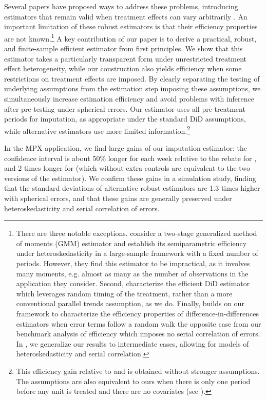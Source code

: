 \documentclass[english,11pt]{article}
\theoremstyle{plain}
\theoremstyle{plain}
\theoremstyle{plain}
\theoremstyle{plain}
\let\ref\Cref
\begin{document}
Several papers have proposed ways to address these problems, introducing
estimators that remain valid when treatment effects can vary arbitrarily
\parencite{DeChaisemartin2020,Abraham2018,Callaway2018,Marcus2020,Cengiz2019}.
An important limitation of these robust estimators is that their efficiency
properties are not known.\footnote{There are three notable exceptions. \textcite{Marcus2020} consider
a two-stage generalized method of moments (GMM) estimator and establish
its semiparametric efficiency under heteroskedasticity in a large-sample
framework with a fixed number of periods. However, they find this
estimator to be impractical, as it involves many moments, e.g. almost
as many as the number of observations in the application they consider.
Second, \textcite{Roth2021} characterize the efficient DiD estimator
which leverages random timing of the treatment, rather than a more
conventional parallel trends assumption, as we do. Finally, \textcite{harmon_DiD}
builds on our framework to characterize the efficiency properties
of difference-in-differences estimators when error terms follow a
random walk \textemdash{} the opposite case from our benchmark analysis
of efficiency which imposes no serial correlation of errors. In \ref{subsec:appx-GLS},
we generalize our results to intermediate cases, allowing for models
of heteroskedasticity and serial correlation.} A key contribution of our paper is to derive a practical, robust,
and finite-sample efficient estimator from first principles. We show
that this estimator takes a particularly transparent form under unrestricted
treatment effect heterogeneity, while our construction also yields
efficiency when some restrictions on treatment effects are imposed.
By clearly separating the testing of underlying assumptions from the
estimation step imposing these assumptions, we simultaneously increase
estimation efficiency and avoid problems with inference after pre-testing
under spherical errors. Our estimator uses all pre-treatment periods
for imputation, as appropriate under the standard DiD assumptions,
while alternative estimators use more limited information.\footnote{This efficiency gain relative to \textcite{DeChaisemartin2020} and
\textcite{Abraham2018} is obtained without stronger assumptions.
The \textcite{Callaway2018} assumptions are also equivalent to ours
when there is only one period before any unit is treated and there
are no covariates (see \textcite{Marcus2020}).}

In the MPX application, we find large gains of our imputation estimator:
the confidence interval is about 50\% longer for each week relative
to the rebate for \textcite{DeChaisemartin2020}, and 2
times longer for \textcite{Abraham2018} (which without extra controls
are equivalent to the two versions of the \textcite{Callaway2018}
estimator). We confirm these gains in a simulation study, finding
that the standard deviations of alternative robust estimators are
1.3 times higher with spherical errors, and that these
gains are generally preserved under heteroskedasticity and serial
correlation of errors.
\end{document}
